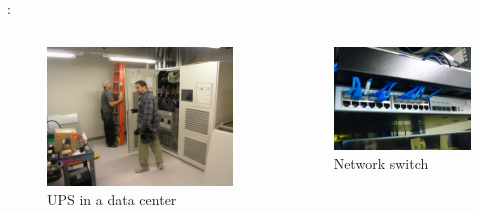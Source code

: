 \documentclass[aspectratio=169]{beamer}
\begin{document}
\begin{frame}{\insertsectionhead: \insertsubsectionhead}
    \begin{columns}
        \begin{column}{0.5\paperwidth}
            \begin{figure}
                \includegraphics[width = 0.8\columnwidth, keepaspectratio]{ups}
                \caption{UPS in a data center \cite{ups}}
            \end{figure}
        \end{column}

        \begin{column}{0.5\paperwidth}
            \begin{figure}
                \includegraphics[width = 0.8\columnwidth, keepaspectratio]{network_switch}
                \caption{Network switch \cite{network_switch}}
            \end{figure}
        \end{column}
    \end{columns}
\end{frame}
\end{document}
